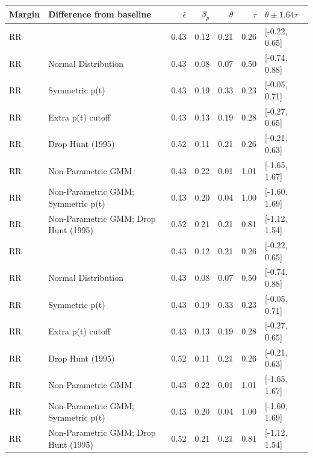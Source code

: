 \begin{table}[ht]
\centering
\begin{tabular}{llrrrrl}
  \hline
Margin & Difference from baseline & $\bar{\epsilon}$ & $\beta_p$ & $\bar{\theta}$ & $\tau$ & $\bar{\theta} \pm 1.64\tau$ \\ 
  \hline
RR &  & 0.43 & 0.12 & 0.21 & 0.26 & [-0.22, 0.65] \\ 
  RR & Normal Distribution & 0.43 & 0.08 & 0.07 & 0.50 & [-0.74, 0.88] \\ 
  RR & Symmetric p(t) & 0.43 & 0.19 & 0.33 & 0.23 & [-0.05, 0.71] \\ 
  RR & Extra p(t) cutoff & 0.43 & 0.13 & 0.19 & 0.28 & [-0.27, 0.65] \\ 
  RR & Drop Hunt (1995) & 0.52 & 0.11 & 0.21 & 0.26 & [-0.21, 0.63] \\ 
  RR & Non-Parametric GMM & 0.43 & 0.22 & 0.01 & 1.01 & [-1.65, 1.67] \\ 
  RR & Non-Parametric GMM; Symmetric p(t) & 0.43 & 0.20 & 0.04 & 1.00 & [-1.60, 1.69] \\ 
  RR &  Non-Parametric GMM; Drop Hunt (1995) & 0.52 & 0.21 & 0.21 & 0.81 & [-1.12, 1.54] \\ 
  RR &  & 0.43 & 0.12 & 0.21 & 0.26 & [-0.22, 0.65] \\ 
  RR & Normal Distribution & 0.43 & 0.08 & 0.07 & 0.50 & [-0.74, 0.88] \\ 
  RR & Symmetric p(t) & 0.43 & 0.19 & 0.33 & 0.23 & [-0.05, 0.71] \\ 
  RR & Extra p(t) cutoff & 0.43 & 0.13 & 0.19 & 0.28 & [-0.27, 0.65] \\ 
  RR & Drop Hunt (1995) & 0.52 & 0.11 & 0.21 & 0.26 & [-0.21, 0.63] \\ 
  RR & Non-Parametric GMM & 0.43 & 0.22 & 0.01 & 1.01 & [-1.65, 1.67] \\ 
  RR & Non-Parametric GMM; Symmetric p(t) & 0.43 & 0.20 & 0.04 & 1.00 & [-1.60, 1.69] \\ 
  RR &  Non-Parametric GMM; Drop Hunt (1995) & 0.52 & 0.21 & 0.21 & 0.81 & [-1.12, 1.54] \\ 
   \hline
\end{tabular}
\end{table}
